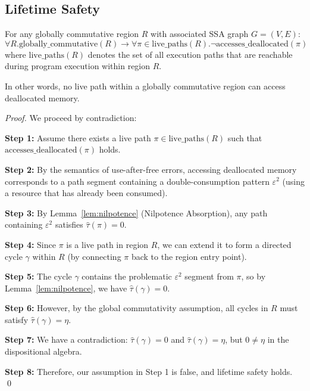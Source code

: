\documentclass[journal]{IEEEtran}
\begin{document}
\subsection{Lifetime Safety}

\begin{theorem}  
For any globally commutative region $R$ with associated SSA graph $G = (V, E)$:
$$\forall R. \text{globally\_commutative}(R) \rightarrow \forall \pi \in \text{live\_paths}(R). \neg \text{accesses\_deallocated}(\pi)$$
where $\text{live\_paths}(R)$ denotes the set of all execution paths that are reachable during program execution within region $R$.

In other words, no live path within a globally commutative region can access deallocated memory.
\end{theorem}

\begin{proof}
We proceed by contradiction:

\textbf{Step 1:} Assume there exists a live path $\pi \in \text{live\_paths}(R)$ such that $\text{accesses\_deallocated}(\pi)$ holds.

\textbf{Step 2:} By the semantics of use-after-free errors, accessing deallocated memory corresponds to a path segment containing a double-consumption pattern $\varepsilon^2$ (using a resource that has already been consumed).

\textbf{Step 3:} By Lemma~\ref{lem:nilpotence} (Nilpotence Absorption), any path containing $\varepsilon^2$ satisfies $\hat{\tau}(\pi) = 0$.

\textbf{Step 4:} Since $\pi$ is a live path in region $R$, we can extend it to form a directed cycle $\gamma$ within $R$ (by connecting $\pi$ back to the region entry point).

\textbf{Step 5:} The cycle $\gamma$ contains the problematic $\varepsilon^2$ segment from $\pi$, so by Lemma~\ref{lem:nilpotence}, we have $\hat{\tau}(\gamma) = 0$.

\textbf{Step 6:} However, by the global commutativity assumption, all cycles in $R$ must satisfy $\hat{\tau}(\gamma) = \eta$.

\textbf{Step 7:} We have a contradiction: $\hat{\tau}(\gamma) = 0$ and $\hat{\tau}(\gamma) = \eta$, but $0 \neq \eta$ in the dispositional algebra.

\textbf{Step 8:} Therefore, our assumption in Step 1 is false, and lifetime safety holds. \qed
\end{proof}
\end{document}
